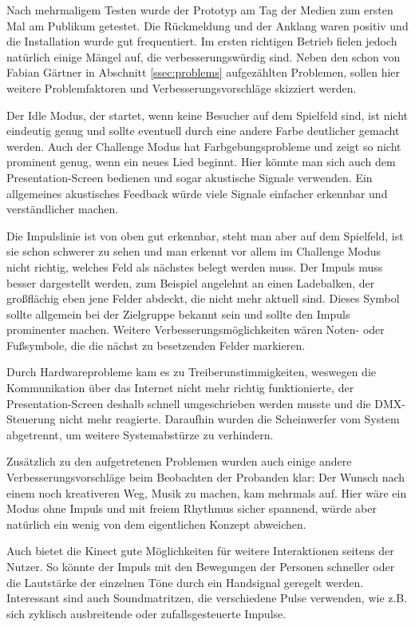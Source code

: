 \label{ssec:Praxis}

Nach mehrmaligem Testen wurde der Prototyp am Tag der Medien zum ersten Mal am Publikum getestet. Die Rückmeldung und der Anklang waren positiv und die Installation wurde gut frequentiert. Im ersten richtigen Betrieb fielen jedoch natürlich einige Mängel auf, die verbesserungswürdig sind. Neben den schon von Fabian Gärtner in Abschnitt \ref{ssec:problems} aufgezählten Problemen, sollen hier weitere Problemfaktoren und Verbesserungsvorschläge skizziert werden.

Der Idle Modus, der startet, wenn keine Besucher auf dem Spielfeld sind, ist nicht eindeutig genug und sollte eventuell durch eine andere Farbe deutlicher gemacht werden. Auch der Challenge Modus hat Farbgebungsprobleme und zeigt so nicht prominent genug, wenn ein neues Lied beginnt. Hier könnte man sich auch dem Presentation-Screen bedienen und sogar akustische Signale verwenden. Ein allgemeines akustisches Feedback würde viele Signale einfacher erkennbar und verständlicher machen.

Die Impulslinie ist von oben gut erkennbar, steht man aber auf dem Spielfeld, ist sie schon schwerer zu sehen und man erkennt vor allem im Challenge Modus nicht richtig, welches Feld als nächstes belegt werden muss. Der Impuls muss besser dargestellt werden, zum Beispiel angelehnt an einen Ladebalken, der großflächig eben jene Felder abdeckt, die nicht mehr aktuell sind. Dieses Symbol sollte allgemein bei der Zielgruppe bekannt sein und sollte den Impuls prominenter machen. Weitere Verbesserungsmöglichkeiten wären Noten- oder Fußsymbole, die die nächst zu besetzenden Felder markieren.

Durch Hardwareprobleme kam es zu Treiberunstimmigkeiten, weswegen die Kommunikation über das Internet nicht mehr richtig funktionierte, der Presentation-Screen deshalb schnell umgeschrieben werden musste und die DMX-Steuerung nicht mehr reagierte. Daraufhin wurden die Scheinwerfer vom System abgetrennt, um weitere Systemabstürze zu verhindern.

Zusätzlich zu den aufgetretenen Problemen wurden auch einige andere Verbesserungsvorschläge beim Beobachten der Probanden klar: Der Wunsch nach einem noch kreativeren Weg, Musik zu machen, kam mehrmals auf. Hier wäre ein Modus ohne Impuls und mit freiem Rhythmus sicher spannend, würde aber natürlich ein wenig von dem eigentlichen Konzept abweichen.

Auch bietet die Kinect gute Möglichkeiten für weitere Interaktionen seitens der Nutzer. So könnte der Impuls mit den Bewegungen der Personen schneller oder die Lautstärke der einzelnen Töne durch ein Handsignal geregelt werden. Interessant sind auch Soundmatritzen, die verschiedene Pulse verwenden, wie z.B. sich zyklisch ausbreitende oder zufallsgesteuerte Impulse.

